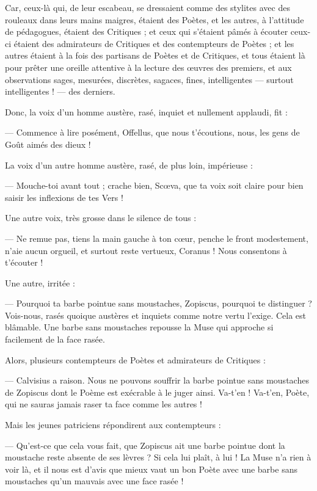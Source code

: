 \documentclass[a4paper, 11pt, oneside, polutonikogreek, french]{article}
\begin{document}
Car, ceux-là qui, de leur escabeau, se dressaient comme des stylites avec des rouleaux dans leurs mains maigres, étaient des Poètes, et les autres, à l'attitude de pédagogues, étaient des Critiques ; et ceux qui s'étaient pâmés à écouter ceux-ci étaient des admirateurs de Critiques et des contempteurs de Poètes ; et les autres étaient à la fois des partisans de Poètes et de Critiques, et tous étaient là pour prêter une oreille attentive à la lecture des œuvres des premiers, et aux observations sages, mesurées, discrètes, sagaces, fines, intelligentes --- surtout intelligentes ! --- des derniers.

Donc, la voix d'un homme austère, rasé, inquiet et nullement applaudi, fit :

--- Commence à lire posément, Offellus, que nous t'écoutions, nous, les gens de Goût aimés des dieux !

La voix d'un autre homme austère, rasé, de plus loin, impérieuse :

--- Mouche-toi avant tout ; crache bien, Scœva, que ta voix soit claire pour bien saisir les inflexions de tes Vers !

Une autre voix, très grosse dans le silence de tous :

--- Ne remue pas, tiens la main gauche à ton cœur, penche le front modestement, n'aie aucun orgueil, et surtout reste vertueux, Coranus ! Nous consentons à t'écouter !

Une autre, irritée :

--- Pourquoi ta barbe pointue sans moustaches, Zopiscus, pourquoi te distinguer ? Vois-nous, rasés quoique austères et inquiets comme notre vertu l'exige. Cela est blâmable. Une barbe sans moustaches repousse la Muse qui approche si facilement de la face rasée.

Alors, plusieurs contempteurs de Poètes et admirateurs de Critiques :

--- Calvisius a raison. Nous ne pouvons souffrir la barbe pointue sans moustaches de Zopiscus dont le Poème est exécrable à le juger ainsi. Va-t'en ! Va-t'en, Poète, qui ne sauras jamais raser ta face comme les autres !

Mais les jeunes patriciens répondirent aux contempteurs :

--- Qu'est-ce que cela vous fait, que Zopiscus ait une barbe pointue dont la moustache reste absente de ses lèvres ? Si cela lui plaît, à lui ! La Muse n'a rien à voir là, et il nous est d'avis que mieux vaut un bon Poète avec une barbe sans moustaches qu'un mauvais avec une face rasée !
\end{document}
